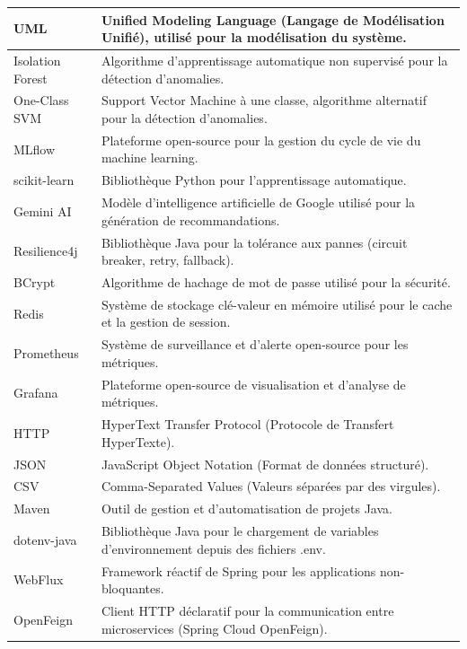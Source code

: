 \begin{center}
\begin{longtable}{|p{3.5cm}|p{11.5cm}|}
        \hline
        UML & Unified Modeling Language (Langage de Modélisation Unifié), utilisé pour la modélisation du système. \\
        \hline
        Isolation Forest & Algorithme d'apprentissage automatique non supervisé pour la détection d'anomalies. \\
        \hline
        One-Class SVM & Support Vector Machine à une classe, algorithme alternatif pour la détection d'anomalies. \\
        \hline
        MLflow & Plateforme open-source pour la gestion du cycle de vie du machine learning. \\
        \hline
        scikit-learn & Bibliothèque Python pour l'apprentissage automatique. \\
        \hline
        Gemini AI & Modèle d'intelligence artificielle de Google utilisé pour la génération de recommandations. \\
        \hline
        Resilience4j & Bibliothèque Java pour la tolérance aux pannes (circuit breaker, retry, fallback). \\
        \hline
        BCrypt & Algorithme de hachage de mot de passe utilisé pour la sécurité. \\
        \hline
        Redis & Système de stockage clé-valeur en mémoire utilisé pour le cache et la gestion de session. \\
        \hline
        Prometheus & Système de surveillance et d'alerte open-source pour les métriques. \\
        \hline
        Grafana & Plateforme open-source de visualisation et d'analyse de métriques. \\
        \hline
        HTTP & HyperText Transfer Protocol (Protocole de Transfert HyperTexte). \\
        \hline
        JSON & JavaScript Object Notation (Format de données structuré). \\
        \hline
        CSV & Comma-Separated Values (Valeurs séparées par des virgules). \\
        \hline
        Maven & Outil de gestion et d'automatisation de projets Java. \\
        \hline
        dotenv-java & Bibliothèque Java pour le chargement de variables d'environnement depuis des fichiers .env. \\
        \hline
        WebFlux & Framework réactif de Spring pour les applications non-bloquantes. \\
        \hline
        OpenFeign & Client HTTP déclaratif pour la communication entre microservices (Spring Cloud OpenFeign). \\
        \hline
    
    \end{longtable}
\end{center}
